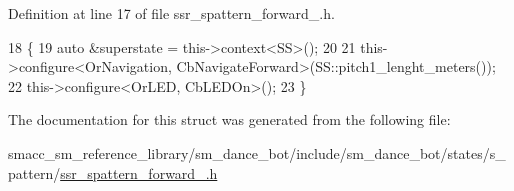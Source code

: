 Definition at line 17 of file ssr\+\_\+spattern\+\_\+forward\+\_.\+h.


\begin{DoxyCode}
18   \{
19     \textcolor{keyword}{auto} &superstate = this->context<SS>();
20 
21     this->configure<OrNavigation, CbNavigateForward>(SS::pitch1\_lenght\_meters());
22     this->configure<OrLED, CbLEDOn>();
23   \}
\end{DoxyCode}


The documentation for this struct was generated from the following file\+:\begin{DoxyCompactItemize}
\item 
smacc\+\_\+sm\+\_\+reference\+\_\+library/sm\+\_\+dance\+\_\+bot/include/sm\+\_\+dance\+\_\+bot/states/s\+\_\+pattern/\hyperlink{ssr__spattern__forward__2_8h}{ssr\+\_\+spattern\+\_\+forward\+\_.\+h}\end{DoxyCompactItemize}
